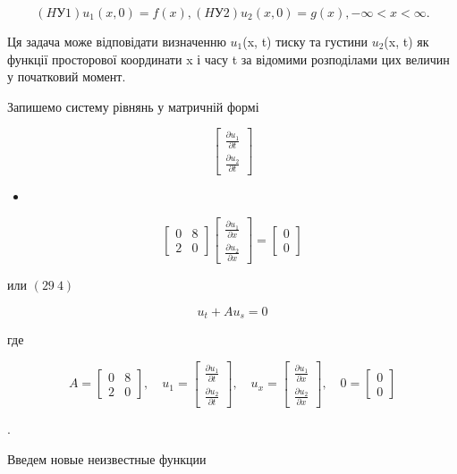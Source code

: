 \documentclass[
  ukrainian,
]{article}
\providecommand{\tightlist}{%
  \setlength{\itemsep}{0pt}\setlength{\parskip}{0pt}}
\begin{document}
\[
(HУ 1)  u_1(x, 0) = f(x)  ,
(HУ 2)  u_2(x, 0) = g(x)  ,  -\infty < x < \infty  .
\]

Ця задача може відповідати визначенню \(u_1\)(x, t) тиску та густини
\(u_2\)(x, t) як функції просторової координати x і часу t за відомими
розподілами цих величин у початковий момент.

Запишемо систему рівнянь у матричній формі

\[
\begin{bmatrix} \frac{\partial u_1}{\partial t} \\ \frac{\partial u_2}{\partial t} \end{bmatrix}
\]

\begin{itemize}
\tightlist
\item
\end{itemize}

\[
\begin{bmatrix} 0 & 8 \\ 2 & 0 \end{bmatrix}
\begin{bmatrix} \frac{\partial u_1}{\partial x} \\ \frac{\partial u_2}{\partial x} \end{bmatrix}
=
\begin{bmatrix} 0 \\ 0 \end{bmatrix}
\]

или \((29 \ 4)\)

\[
u_t + Au_s = 0
\]

где

\[
A =
\begin{bmatrix} 0 & 8 \\ 2 & 0 \end{bmatrix}
, \quad u_1 =
\begin{bmatrix} \frac{\partial u_1}{\partial t} \\ \frac{\partial u_2}{\partial t} \end{bmatrix}
, \quad u_x =
\begin{bmatrix} \frac{\partial u_1}{\partial x} \\ \frac{\partial u_2}{\partial x} \end{bmatrix}
, \quad 0 =
\begin{bmatrix} 0 \\ 0 \end{bmatrix}
\]

.

Введем новые неизвестные функции
\end{document}
